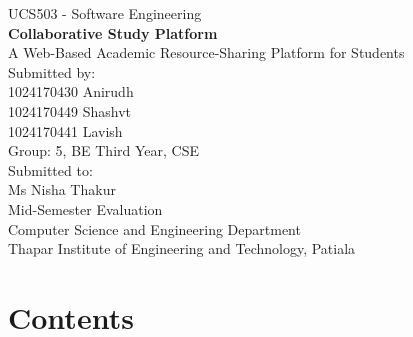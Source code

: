 \documentclass[12pt]{report}
\begin{document}
\begin{titlepage}
    \centering
    \vspace*{1cm}
    {\large UCS503 - Software Engineering}\\[1.5cm]
    {\Huge \bfseries Collaborative Study Platform}\\[0.5cm]
    {\large A Web-Based Academic Resource-Sharing Platform for Students}\\[2cm]

    {\large Submitted by:}\\[0.3cm]
    1024170430 \quad Anirudh\\
    1024170449 \quad Shashvt\\
    1024170441 \quad Lavish\\[0.5cm]
    Group: 5, BE Third Year, CSE\\[2cm]

    {\large Submitted to:}\\[0.3cm]
    Ms Nisha Thakur\\
    Mid-Semester Evaluation\\[2cm]

    \vfill
    Computer Science and Engineering Department\\
    Thapar Institute of Engineering and Technology, Patiala
\end{titlepage}

\chapter*{Contents}
\end{document}
